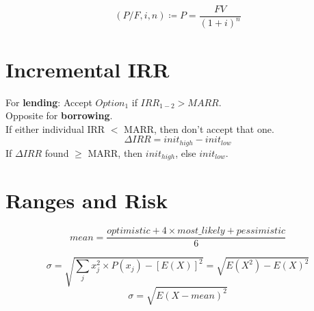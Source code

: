 \documentclass[10pt]{article}
\begin{document}
\begin{multicols*}{2}
\begin{equation*}
  (P/F, i, n) \coloneqq P = \frac{FV}{{(1+i)}^n}
\end{equation*}

\section{Incremental IRR}
  For \textbf{lending}: Accept $Option_1$ if $IRR_{1-2} > MARR$.\\
  Opposite for \textbf{borrowing}.\\
  If either individual IRR $<$ MARR, then don't accept that one.
\begin{equation*}
  \Delta IRR = init_{high} - init_{low}
\end{equation*}
  If $\Delta IRR$ found $\geq$ MARR, then $init_{high}$, else $init_{low}$.

  \section{Ranges and Risk}
\begin{equation*}
  mean = \frac{optimistic + 4\times most\_likely + pessimistic}{6}
\end{equation*}

\begin{equation*}
  \sigma = \sqrt{\sum_j x_j^2 \times P(x_j) - {\left[ E(X) \right]}^2} = \sqrt{E(X^2) - {E(X)}^2}
\end{equation*}
\begin{equation*}
  \sigma = \sqrt{{E(X-mean)}^2}
\end{equation*}

\begin{equation*}
\end{equation*}

\end{multicols*}
\end{document}
